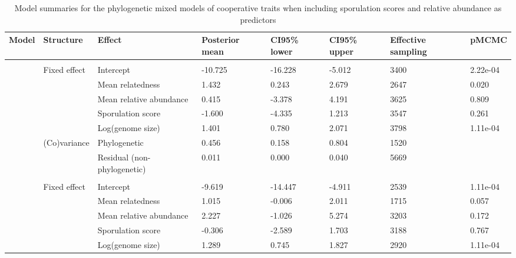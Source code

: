 \documentclass[border=1mm, preview]{standalone}
\begin{document}
\begin{table}

\caption{\label{tab:}Model summaries for the phylogenetic mixed models of cooperative traits when including sporulation scores and relative abundance as predictors}
\centering
\begin{tabular}[t]{llllllll}
\toprule
Model & Structure & Effect & Posterior
 mean & CI95\% lower & CI95\% upper & Effective
 sampling & pMCMC\\
\midrule
\addlinespace[0.3em]
\multicolumn{8}{l}{\textbf{Siderophores}}\\
\hspace{1em} & Fixed effect & Intercept & -10.725 & -16.228 & -5.012 & 3400 & 2.22e-04\\
\hspace{1em} &  & Mean relatedness & 1.432 & 0.243 & 2.679 & 2647 & 0.020\\
\hspace{1em} &  & Mean relative abundance & 0.415 & -3.378 & 4.191 & 3625 & 0.809\\
\hspace{1em} &  & Sporulation score & -1.600 & -4.335 & 1.213 & 3547 & 0.261\\
\hspace{1em} &  & Log(genome size) & 1.401 & 0.780 & 2.071 & 3798 & 1.11e-04\\
\hspace{1em} & (Co)variance & Phylogenetic & 0.456 & 0.158 & 0.804 & 1520 & \\
\hspace{1em} &  & Residual (non-phylogenetic) & 0.011 & 0.000 & 0.040 & 5669 & \\
\addlinespace[0.3em]
\multicolumn{8}{l}{\textbf{Biofilm}}\\
\hspace{1em} & Fixed effect & Intercept & -9.619 & -14.447 & -4.911 & 2539 & 1.11e-04\\
\hspace{1em} &  & Mean relatedness & 1.015 & -0.006 & 2.011 & 1715 & 0.057\\
\hspace{1em} &  & Mean relative abundance & 2.227 & -1.026 & 5.274 & 3203 & 0.172\\
\hspace{1em} &  & Sporulation score & -0.306 & -2.589 & 1.703 & 3188 & 0.767\\
\hspace{1em} &  & Log(genome size) & 1.289 & 0.745 & 1.827 & 2920 & 1.11e-04\\

\end{tabular}
\end{table}
\end{document}
